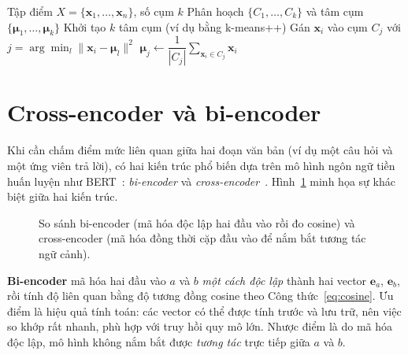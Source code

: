 \begin{algorithm}[ht]
\caption{Thuật toán K-means}
\label{alg:kmeans}
\begin{algorithmic}[1]
\Require Tập điểm $X = \{\mathbf{x}_1, \dots, \mathbf{x}_n\}$, số cụm $k$
\Ensure Phân hoạch $\{C_1, \dots, C_k\}$ và tâm cụm $\{\boldsymbol{\mu}_1, \dots, \boldsymbol{\mu}_k\}$
\State Khởi tạo $k$ tâm cụm (ví dụ bằng k-means++)
\Repeat
    \State Gán $\mathbf{x}_i$ vào cụm $C_j$ với $j = \arg\min_{l} \lVert \mathbf{x}_i - \boldsymbol{\mu}_l \rVert^2$
  \EndFor
    \State $\boldsymbol{\mu}_j \gets \dfrac{1}{|C_j|} \sum_{\mathbf{x}_i \in C_j} \mathbf{x}_i$
  \EndFor
{}
\end{algorithmic}
\end{algorithm}

\section{Cross-encoder và bi-encoder}
\label{sec:crossencoder-bg}

Khi cần chấm điểm mức liên quan giữa hai đoạn văn bản (ví dụ một câu hỏi và một ứng viên trả lời),
có hai kiến trúc phổ biến dựa trên mô hình ngôn ngữ tiền huấn luyện như BERT~\cite{devlin2019bert}:
\textit{bi-encoder} và \textit{cross-encoder}~\cite{reimers2019sbert}. Hình~\ref{fig:bi-cross}
minh họa sự khác biệt giữa hai kiến trúc.

\begin{figure}[ht]
  \centering
  \caption{So sánh bi-encoder (mã hóa độc lập hai đầu vào rồi đo cosine) và cross-encoder (mã hóa
  đồng thời cặp đầu vào để nắm bắt tương tác ngữ cảnh). }
  \label{fig:bi-cross}
\end{figure}

\textbf{Bi-encoder} mã hóa hai đầu vào $a$ và $b$ \emph{một cách độc lập} thành hai vector
$\mathbf{e}_a$, $\mathbf{e}_b$, rồi tính độ liên quan bằng độ tương đồng cosine theo
Công thức~\eqref{eq:cosine}. Ưu điểm là hiệu quả tính toán: các vector có thể được tính trước và
lưu trữ, nên việc so khớp rất nhanh, phù hợp với truy hồi quy mô lớn. Nhược điểm là do mã hóa độc
lập, mô hình không nắm bắt được \emph{tương tác} trực tiếp giữa $a$ và $b$.

